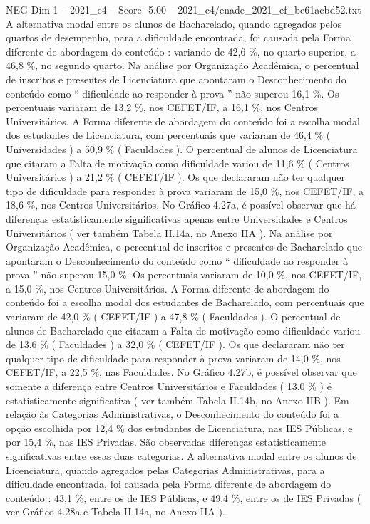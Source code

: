 \begin{textsample}{NEG Dim 1 – 2021\_c4 – Score -5.00 – 2021\_c4/enade\_2021\_ef\_be61acbd52.txt}
A alternativa modal entre os alunos de Bacharelado, quando agregados pelos quartos de desempenho, para a dificuldade encontrada, foi causada pela Forma diferente de abordagem do conteúdo : variando de 42,6 \%, no quarto superior, a 46,8 \%, no segundo quarto.
Na análise por Organização Acadêmica, o percentual de inscritos e presentes de Licenciatura que apontaram o Desconhecimento do conteúdo como “ dificuldade ao responder à prova ” não superou 16,1 \%.
Os percentuais variaram de 13,2 \%, nos CEFET/IF, a 16,1 \%, nos Centros Universitários.
A Forma diferente de abordagem do conteúdo foi a escolha modal dos estudantes de Licenciatura, com percentuais que variaram de 46,4 \% ( Universidades ) a 50,9 \% ( Faculdades ).
O percentual de alunos de Licenciatura que citaram a Falta de motivação como dificuldade variou de 11,6 \% ( Centros Universitários ) a 21,2 \% ( CEFET/IF ).
Os que declararam não ter qualquer tipo de dificuldade para responder à prova variaram de 15,0 \%, nos CEFET/IF, a 18,6 \%, nos Centros Universitários.
No Gráfico 4.27a, é possível observar que há diferenças estatisticamente significativas apenas entre Universidades e Centros Universitários ( ver também Tabela II.14a, no Anexo IIA ).
Na análise por Organização Acadêmica, o percentual de inscritos e presentes de Bacharelado que apontaram o Desconhecimento do conteúdo como “ dificuldade ao responder à prova ” não superou 15,0 \%.
Os percentuais variaram de 10,0 \%, nos CEFET/IF, a 15,0 \%, nos Centros Universitários.
A Forma diferente de abordagem do conteúdo foi a escolha modal dos estudantes de Bacharelado, com percentuais que variaram de 42,0 \% ( CEFET/IF ) a 47,8 \% ( Faculdades ).
O percentual de alunos de Bacharelado que citaram a Falta de motivação como dificuldade variou de 13,6 \% ( Faculdades ) a 32,0 \% ( CEFET/IF ).
Os que declararam não ter qualquer tipo de dificuldade para responder à prova variaram de 14,0 \%, nos CEFET/IF, a 22,5 \%, nas Faculdades.
No Gráfico 4.27b, é possível observar que somente a diferença entre Centros Universitários e Faculdades ( 13,0 \% ) é estatisticamente significativa ( ver também Tabela II.14b, no Anexo IIB ).
Em relação às Categorias Administrativas, o Desconhecimento do conteúdo foi a opção escolhida por 12,4 \% dos estudantes de Licenciatura, nas IES Públicas, e por 15,4 \%, nas IES Privadas.
São observadas diferenças estatisticamente significativas entre essas duas categorias.
A alternativa modal entre os alunos de Licenciatura, quando agregados pelas Categorias Administrativas, para a dificuldade encontrada, foi causada pela Forma diferente de abordagem do conteúdo : 43,1 \%, entre os de IES Públicas, e 49,4 \%, entre os de IES Privadas ( ver Gráfico 4.28a e Tabela II.14a, no Anexo IIA ).

\end{textsample}
